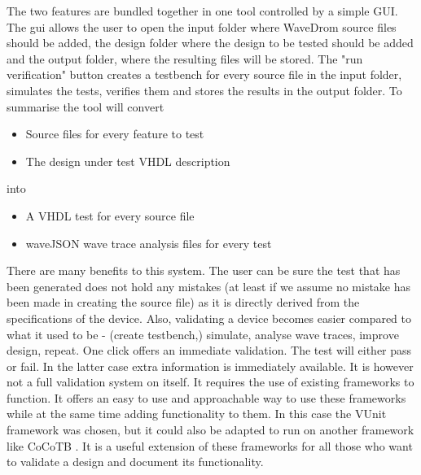 The two features are bundled together in one tool controlled by a simple GUI.\nline
{}\nline
The gui allows the user to open the input folder where WaveDrom source files should be added, the design folder where the design to be tested should be added and the output folder, where the resulting files will be stored. The "run verification" button creates a testbench for every source file in the input folder, simulates the tests, verifies them and stores the results in the output folder.
\npar
To summarise the tool will convert
\begin{itemize}
	\item Source files for every feature to test
	\item The design under test VHDL description
\end{itemize}
into
\begin{itemize}
	\item A VHDL test for every source file
	\item waveJSON wave trace analysis files for every test
\end{itemize}\newpage\noindent
There are many benefits to this system. The user can be sure the test that has been generated does not hold any mistakes (at least if we assume no mistake has been made in creating the source file) as it is directly derived from the specifications of the device. Also, validating a device becomes easier compared to what it used to be - (create testbench,) simulate, analyse wave traces, improve design, repeat. One click offers an immediate validation. The test will either pass or fail. In the latter case extra information is immediately available.
\npar
It is however not a full validation system on itself. It requires the use of existing frameworks to function. It offers an easy to use and approachable way to use these frameworks while at the same time adding functionality to them. In this case the VUnit framework was chosen, but it could also be adapted to run on another framework like CoCoTB \cite{cocotb}. It is a useful extension of these frameworks for all those who want to validate a design and document its functionality. 

